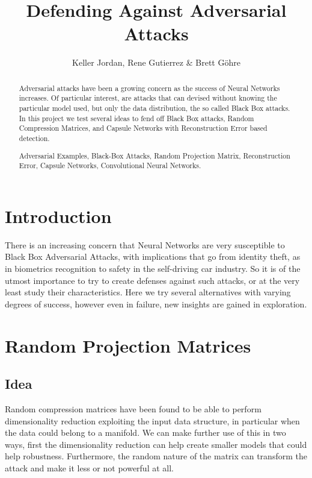\documentclass{asaproc}
\title{Defending Against Adversarial Attacks}
\author{Keller Jordan, Rene Gutierrez \& Brett G\"{o}hre \\}
\begin{document}
\maketitle


\begin{abstract}
	
Adversarial attacks have been a growing concern as the success of Neural Networks increases. Of particular interest, are attacks that can devised without knowing the particular model used, but only the data distribution, the so called Black Box attacks. In this project we test several ideas to fend off Black Box attacks, Random Compression Matrices, and Capsule Networks with Reconstruction Error based detection.
	
\begin{keywords}
Adversarial Examples, Black-Box Attacks, Random Projection Matrix, Reconstruction Error, Capsule Networks, Convolutional Neural Networks.
\end{keywords}
\end{abstract}


\section{Introduction}

There is an increasing concern that Neural Networks are very susceptible to Black Box Adversarial Attacks, with implications that go from identity theft, as in biometrics recognition to safety in the self-driving car industry. So it is of the utmost importance to try to create defenses against such attacks, or at the very least study their characteristics. Here we try several alternatives with varying degrees of success, however even in failure, new insights are gained in exploration.

\section{Random Projection Matrices}

\subsection*{Idea}

Random compression matrices have been found to be able to perform dimensionality reduction exploiting the input data structure, in particular when the data could belong to a manifold. We can make further use of this in two ways, first the dimensionality reduction can help create smaller models that could help robustness. Furthermore, the random nature of the matrix can transform the attack and make it less or not powerful at all.
\end{document}
